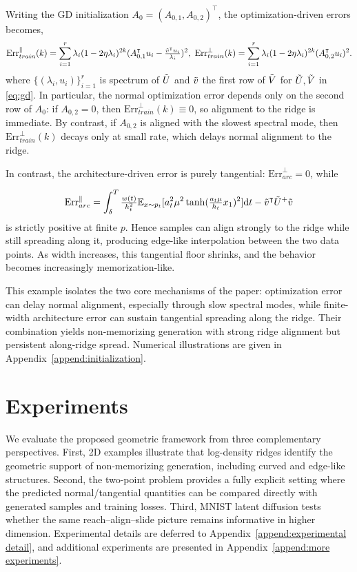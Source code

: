 \documentclass[11pt]{article}
\newcommand{\mb}{\mathbb}
\newcommand{\dee}{\mathrm{d}}
\newcommand{\Err}{\mathrm{Err}}
\begin{document}
Writing the GD initialization $A_0 = (A_{0,1},A_{0,2})^\intercal$, the optimization-driven errors becomes,
\begin{align*}
    \Err_{train}^\parallel(k) = \sum_{i=1}^r \lambda_i (1-2\eta \lambda_i)^{2k} ( A_{0,1}^\intercal u_i - \tfrac{\Tilde{v}^\intercal u_i}{\lambda_i} )^2 , \  \Err_{train}^\perp(k) = \sum_{i=1}^r \lambda_i (1-2\eta \lambda_i)^{2k} ( A_{0,2}^\intercal u_i )^2.
\end{align*} 
where $\{(\lambda_i,u_i)\}_{i=1}^r$ is spectrum of $\Tilde{U}$ and $\Tilde{v}$ the first row of $\Tilde{V}$ for $\Tilde{U},\Tilde{V}$ in \eqref{eq:gd}. In particular, the normal optimization error depends only on the second row of $A_0$: if $A_{0,2}=0$, then $\Err_{train}^\perp(k)\equiv 0$, so alignment to the ridge is immediate. By contrast, if $A_{0,2}$ is aligned with the slowest spectral mode, then $\Err_{train}^\perp(k)$ decays only at small rate, which delays normal alignment to the ridge.

In contrast, the architecture-driven error is purely tangential: $\Err_{arc}^\perp=0$, while 

\begin{align*}
    \Err_{arc}^\parallel
    = \int_\delta^T \tfrac{w(t)}{h_t^2}\mb{E}_{x\sim p_t}[  a_t^2\mu^2 \tanh ( \tfrac{a_t\mu}{h_t}x_1 )^2 ] \dee t  - \Tilde{v}^\intercal \Tilde{U}^+ \Tilde{v} \vspace{-.1cm}
\end{align*}
is strictly positive at finite $p$.
Hence samples can align strongly to the ridge while still spreading along it, producing edge-like interpolation between the two data points. As width increases, this tangential floor shrinks, and the behavior becomes increasingly memorization-like.

This example isolates the two core mechanisms of the paper: optimization error can delay normal alignment, especially through slow spectral modes, while finite-width architecture error can sustain tangential spreading along the ridge. Their combination yields non-memorizing generation with strong ridge alignment but persistent along-ridge spread. Numerical illustrations are given in Appendix~\ref{append:initialization}.
\section{Experiments}\label{sec:experiments}
We evaluate the proposed geometric framework from three complementary perspectives. First, 2D examples illustrate that log-density ridges identify the geometric support of non-memorizing generation, including curved and edge-like structures. Second, the two-point problem provides a fully explicit setting where the predicted normal/tangential quantities can be compared directly with generated samples and training losses. Third, MNIST latent diffusion tests whether the same reach--align--slide picture remains informative in higher dimension. Experimental details are deferred to Appendix~\ref{append:experimental detail}, and additional experiments are presented in Appendix~\ref{append:more experiments}.
\end{document}
